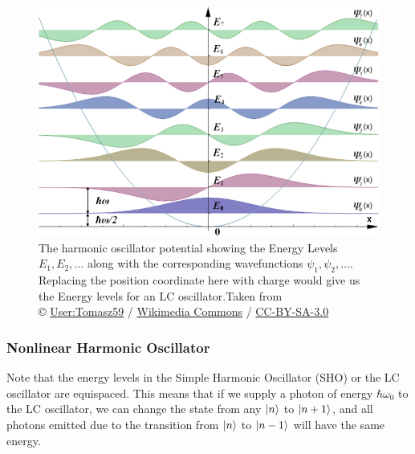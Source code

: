 \begin{figure}
\centering
\includegraphics[width=\linewidth]{Figures/harmonic_oscillator}
\decoRule
\caption[Harmonic Oscillator Energy Levels]{The harmonic oscillator potential showing the Energy Levels $E_1,E_2,\ldots$ along with the corresponding wavefunctions $\psi_1,\psi_2,\ldots$. Replacing the position coordinate here with charge would give us the Energy levels for an LC oscillator.Taken from \\© \href{https://pl.wikipedia.org/wiki/Wikipedysta:Tomasz59}{User:Tomasz59} / \href{http://commons.wikimedia.org/}{Wikimedia Commons} / \href{http://creativecommons.org/licenses/by-sa/3.0/}{CC-BY-SA-3.0}}
\label{fig:harmonic oscillator}
\end{figure}

\subsubsection{Nonlinear Harmonic Oscillator}

Note that the energy levels in the Simple Harmonic Oscillator (SHO) or the LC oscillator are equispaced. This means that if we supply a photon of energy $\hbar\omega_0$ to the LC oscillator, we can change the state from any $\ket{n}$ to $\ket{n+1}$, and all photons emitted due to the transition from $\ket{n}$ to $\ket{n-1}$ will have the same energy.

